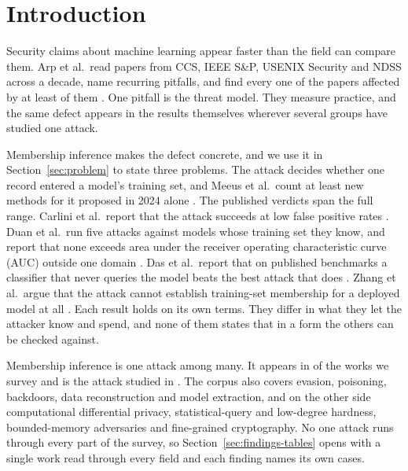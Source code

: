 \section{Introduction}
\label{sec:intro}

Security claims about machine learning appear faster than the field can
compare
them. Arp et al.\ read \DDpapers{} papers from CCS, IEEE S\&P, USENIX Security
and NDSS across a decade, name \DDpitfalls{} recurring pitfalls, and find
every one of the \DDpapers{} papers affected by at least \DDminPitfalls{} of
them
\cite{AQPWPWCR22}. One pitfall is the threat model. They measure practice, and
the same defect appears in the results themselves wherever several groups have
studied one attack.

Membership inference makes the defect concrete, and we use it in
Section~\ref{sec:problem} to state three problems. The attack decides whether
one record entered a model's training set, and Meeus et al.\ count at least
\MIAnewMethods{} new methods for it proposed in 2024 alone \cite{MSJFRM25}. The
published verdicts span the full range. Carlini et al.\ report that the attack
succeeds at low false positive rates \cite{CCNSTT22}. Duan et al.\ run five
attacks against models whose training set they know, and report that none
exceeds \MIAmimirAUC{} area under the receiver operating characteristic curve
(AUC) outside one domain \cite{DSMMSZTCEH24}. Das et al.\ report that on
\MIAblindSets{} published benchmarks a classifier that never queries the model
beats the best attack that does \cite{DZT25}. Zhang et al.\ argue that the
attack cannot establish training-set membership for a deployed model at all
\cite{ZDKT25}. Each result holds on its own terms. They differ in what they
let the attacker know and spend, and none of them states that in a form the
others can be checked against.

Membership inference is one attack among many. It appears in \NumMIApages{} of
the \NumSources{} works we survey and is the attack studied in
\NumMIAfamily{}. The corpus also covers evasion, poisoning, backdoors, data
reconstruction and model extraction, and on the other side computational
differential privacy, statistical-query and low-degree hardness,
bounded-memory adversaries and fine-grained cryptography. No one attack runs
through every part of the survey, so Section~\ref{sec:findings-tables} opens
with a single work read through every field and each finding names its own
cases.

